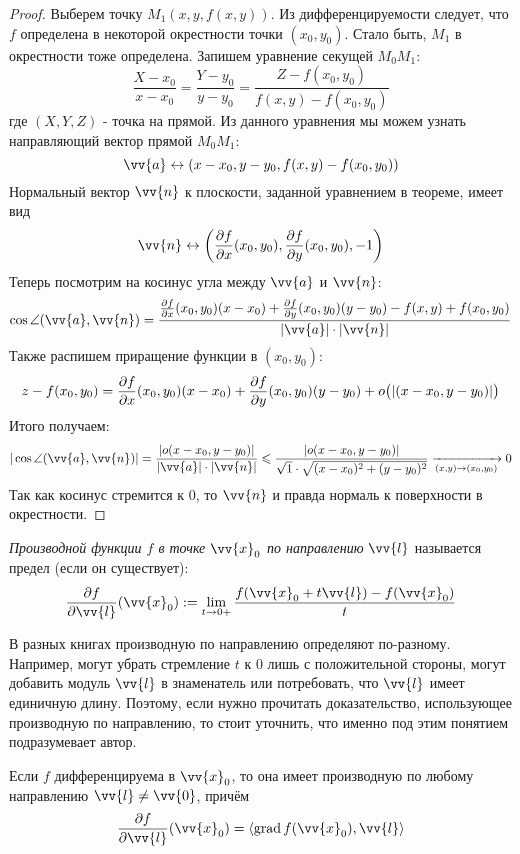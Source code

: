 \begin{proof}
	Выберем точку $M_1(x, y, f(x, y))$. Из дифференцируемости следует, что $f$ определена в некоторой окрестности точки $(x_0, y_0)$. Стало быть, $M_1$ в окрестности тоже определена. Запишем уравнение секущей $M_0 M_1$:
	\[
		\frac{X - x_0}{x - x_0} = \frac{Y - y_0}{y - y_0} = \frac{Z - f(x_0, y_0)}{f(x, y) - f(x_0, y_0)}
	\]
	где $(X, Y, Z)$ - точка на прямой. Из данного уравнения мы можем узнать направляющий вектор прямой $M_0 M_1$:
	\[
		\vv{a} \leftrightarrow (x - x_0, y - y_0, f(x, y) - f(x_0, y_0))
	\]
	Нормальный вектор $\vv{n}$ к плоскости, заданной уравнением в теореме, имеет вид
	\[
		\vv{n} \leftrightarrow \left(\pd{f}{x} (x_0, y_0), \pd{f}{y} (x_0, y_0), -1\right)
	\]
	Теперь посмотрим на косинус угла между $\vv{a}$ и $\vv{n}$:
	\[
		\cos \angle (\vv{a}, \vv{n}) = \frac{\pd{f}{x} (x_0, y_0)(x - x_0) + \pd{f}{y} (x_0, y_0)(y - y_0) - f(x, y) + f(x_0, y_0)}{|\vv{a}|\cdot |\vv{n}|}
	\]
	Также распишем приращение функции в $(x_0, y_0)$:
	\[
		z - f(x_0, y_0) = \frac{\partial f}{\partial x}(x_0, y_0)(x - x_0) + \frac{\partial f}{\partial y}(x_0, y_0)(y - y_0) + o\big(|(x - x_0, y - y_0)|\big)
	\]
	Итого получаем:
	\[
		|\cos \angle (\vv{a}, \vv{n})| = \frac{|o(x - x_0, y - y_0)|}{|\vv{a}|\cdot |\vv{n}|} \leq \frac{|o(x - x_0, y - y_0)|}{\sqrt{1} \cdot \sqrt{(x - x_0)^2 + (y - y_0)^2}} \xrightarrow[(x, y) \to (x_0, y_0)]{} 0
	\]
	Так как косинус стремится к 0, то $\vv{n}$ и правда нормаль к поверхности в окрестности.
\end{proof}

\begin{definition}
	\textit{Производной функции $f$ в точке $\vv{x}_0$ по направлению} $\vv{l}$ называется предел (если он существует):
	\[
		\pd{f}{\vv{l}} (\vv{x}_0) := \liml_{t \to 0+} \frac{f(\vv{x}_0 + t\vv{l}) - f(\vv{x}_0)}{t}
	\]
\end{definition}

\begin{note}
	В разных книгах производную по направлению определяют по-разному. Например, могут убрать стремление $t$ к 0 лишь с положительной стороны, могут добавить модуль $\vv{l}$ в знаменатель или потребовать, что $\vv{l}$ имеет единичную длину. Поэтому, если нужно прочитать доказательство, использующее производную по направлению, то стоит уточнить, что именно под этим понятием подразумевает автор.
\end{note}

\begin{proposition}
	Если $f$ дифференцируема в $\vv{x}_0$, то она имеет производную по любому направлению $\vv{l} \neq \vv{0}$, причём
	\[
		\pd{f}{\vv{l}} (\vv{x}_0) = \trbr{\grad f(\vv{x}_0), \vv{l}}
	\]
\end{proposition}

